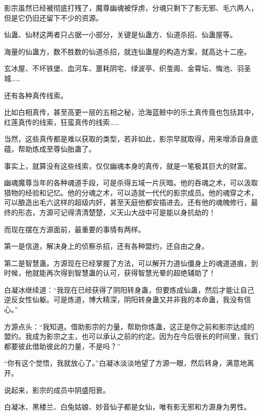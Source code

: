 
\begin{this_body}



影宗虽然已经被彻底打残了，魔尊幽魂被俘虏，分魂只剩下了影无邪、毛六两人，但是它仍旧还留下不少的资源。

仙蛊、仙材这两者只占据一小部分，关键是仙蛊方、仙道杀招、仙蛊屋等。

海量的仙蛊方，数不胜数的仙道杀招，就连仙蛊屋的构造方案，就高达十二座。

玄冰屋、不坏铁堡、血河车、噩耗阴宅、绿波亭、织茧阁、金霄坛、悔池、羽圣城……

还有各种真传线索。

比如白相真传，甚至高更一层的五相之秘，沧海蓝鲸中的乐土真传竟也包括其中，红莲真传的线索，狂蛮真传的线索……

当然，这些真传都是难以获取的类型，若非如此，影宗早就取得，用来增添自身底蕴，帮助炼成至尊仙胎蛊了。

事实上，就算没有这些线索，仅仅幽魂本身的真传，就是一笔极其巨大的财富。

幽魂魔尊当年的各种魂道手段，可是杀得五域一片灰暗。他的吞魂之术，可以汲取猎物的经验和记忆。他的分魂之术，可以造就一代代的影宗成员。他的魂穿之术，可以酿造出毛六这样的超级内奸，甚至天庭他都安插进去。还有他的魂魄修行，最终的形态，方源可记得清清楚楚，义天山大战中可是能以身抗劫的！

而现在摆在方源面前，最重要的事情有两样。

第一是信道，解决身上的侦察杀招，还有各种盟约，还自由之身。

第二是智慧蛊。方源现在已经掌握了方法，可以解开力道仙僵身上的魂道道痕，到时候，他就能再次得到智慧蛊的认可，获得智慧光晕的超绝辅助了！

白凝冰继续道：“我现在已经获得了阴阳转身蛊，但要炼成仙蛊，然后才能让自己逆反女性仙躯。可是炼道，博大精深，阴阳转身蛊又并非我的本命蛊，我没有信心。”

方源点头：“我知道。借助影宗的力量，帮助你炼蛊，这正是你之前和影宗达成的盟约。我成为影宗之主，也可以承认之前的约定。因为在今后很长的时间里，我们都要彼此借助彼此的力量，不是吗？”

“你有这个觉悟，我就放心了。”白凝冰淡淡地望了方源一眼，然后转身，满意地离开。

说起来，影宗的成员中阴盛阳衰。

白凝冰、黑楼兰、白兔姑娘、妙音仙子都是女仙，唯有影无邪和方源身为男性。


\end{this_body}
